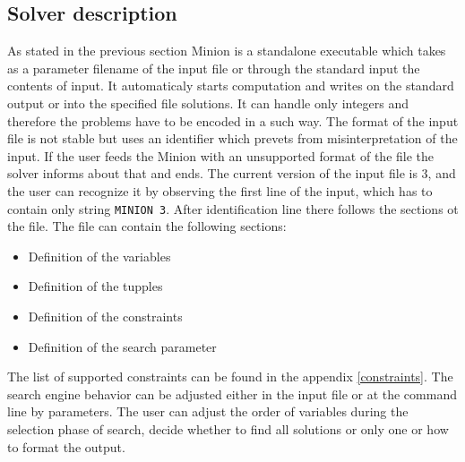 \subsection{Solver description}
As stated in the previous section Minion is a standalone executable which takes as a parameter
filename of the input file or through the standard input the contents of input.
It automaticaly starts computation and writes on the standard output or into the
specified file solutions. It can handle only integers and therefore the problems have to
be encoded in a such way. The format of the input file is not stable but uses an identifier
which prevets from misinterpretation of the input. If the user feeds the Minion with 
an unsupported format of the file the solver informs about that and ends. The current version
of the input file is 3, and the user can recognize it by observing the first line of the input, which
has to contain only string \texttt{MINION 3}. After identification line there follows the sections
ot the file. The file can contain the following sections:

\begin{itemize}
  \item Definition of the variables
  \item Definition of the tupples
  \item Definition of the constraints
  \item Definition of the search parameter
\end{itemize}

The list of supported constraints can be found in the appendix \ref{constraints}.
The search engine behavior can be adjusted either in the input file or at the command line
by parameters. The user can adjust the order of variables during the selection phase of search,
decide whether to find all solutions or only one or how to format the output.

